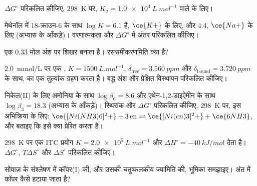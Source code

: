 \begin{exercise}[$\star$]\label{exo:b3:supramolecular:2}
$\Delta G^\circ$ परिकलित कीजिए, \qty{298}{K} पर, $K_a = \qty{1.0e4}{L.mol^{-1}}$ वाले  के लिए।
\end{exercise}

\begin{exercise}[$\star$]\label{exo:b3:supramolecular:3}
मेथेनॉल में 18-क्राउन-6 के साथ $\log K = 6.1$ है, $\ce{K+}$ के लिए, और 4.4, $\ce{Na+}$ के लिए (अभ्यास के आँकड़े)।
वरणात्मकता और $\Delta G^\circ$ में अंतर परिकलित कीजिए।
\end{exercise}

\begin{exercise}[$\star$]\label{exo:b3:supramolecular:4}
एक  0.33  मोल अंश पर शिखर बनाता है। रससमीकरणमिति क्या है?
\end{exercise}

\begin{exercise}[$\star\star$]\label{exo:b3:supramolecular:5}
\qty{2.0}{mmol/L} पर एक , $K = \qty{1500}{L.mol^{-1}}$, $\delta_{\mathrm{free}} = \qty{3.560}{ppm}$ और $\delta_{\mathrm{bound}} = \qty{3.720}{ppm}$ के साथ,  का एक
तुल्यांक ग्रहण करता है। बद्ध अंश और प्रेक्षित विस्थापन परिकलित कीजिए।
\end{exercise}

\begin{exercise}[$\star\star$]\label{exo:b3:supramolecular:6}
निकेल(II) के लिए अमोनिया के साथ $\log\beta_6 = 8.6$ और एथेन-1,2-डाइऐमीन के साथ $\log\beta_3 = 18.3$ (अभ्यास के
आँकड़े)। स्थिरांक और $\Delta G^\circ$ परिकलित कीजिए, \qty{298}{K} पर, इस अभिक्रिया के लिए:
$\ce{[Ni(NH3)6]^2+} + 3\,\mathrm{en} \rightleftharpoons \ce{[Ni(en)3]^2+} + \ce{6NH3}$, और बताइए कि इसे क्या प्रेरित करता है।
\end{exercise}

\begin{exercise}[$\star\star$]\label{exo:b3:supramolecular:7}
\qty{298}{K} पर एक ITC प्रयोग $K = \qty{2.0e5}{L.mol^{-1}}$ और $\Delta H^\circ = \qty{-40}{kJ/mol}$ देता है। $\Delta G^\circ$, $T\Delta S^\circ$ और
$\Delta S^\circ$ परिकलित कीजिए।
\end{exercise}

\begin{exercise}[$\star\star$]\label{exo:b3:supramolecular:8}
सोवाज़ के  संश्लेषण में कॉपर(I) की, और उसकी चतुष्फलकीय ज्यामिति की,
भूमिका समझाइए। अंत में कॉपर कैसे हटाया जाता है?
\end{exercise}

